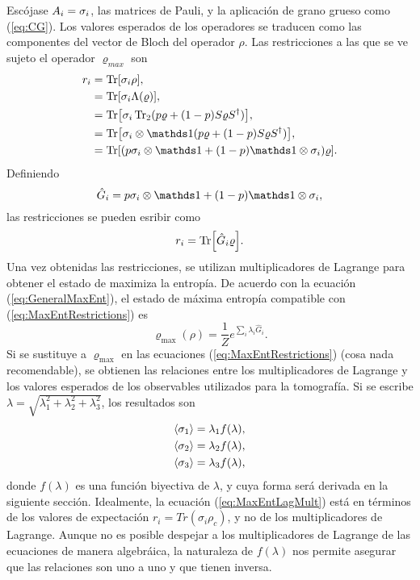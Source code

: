 Escójase ${A_{i}}={\sigma_{i}}$, las matrices de Pauli, y la aplicación de grano grueso como (\ref{eq:CG}). Los valores esperados de los operadores se traducen como las componentes del vector de Bloch del operador $\rho$. Las restricciones a las que se ve sujeto el operador $\varrho_{max}$ son
\begin{align*}
    r_{i}&=\Tr[\pauli{i}\rho],\\
    &=\Tr[\pauli{i}\Lambda(\varrho)],\\
    &=\Tr[\pauli{i}\Tr_{2}(p\varrho+(1-p)S\varrho S^{\dag})],\\
    &=\Tr[\pauli{i}\otimes\Id(p\varrho+(1-p)S\varrho S^{\dag})],\\
    &=\Tr[(p\pauli{i}\otimes\Id+(1-p)\Id\otimes\pauli{i})\varrho].
\end{align*}
Definiendo
\begin{equation}\label{eq:Ghat}
    \hat{G}_{i}=p\pauli{i}\otimes\Id+(1-p)\Id\otimes\pauli{i},
\end{equation}
las restricciones se pueden esribir como
\begin{equation}\label{eq:MaxEntRestrictions}
    r_{i}=\Tr[\hat{G}_{i}\varrho].
\end{equation}
Una vez obtenidas las restricciones, se utilizan multiplicadores de Lagrange para obtener el estado de maximiza la entropía. De acuerdo con la ecuación (\ref{eq:GeneralMaxEnt}), el estado de máxima entropía compatible con (\ref{eq:MaxEntRestrictions}) es
\begin{equation}\label{eq:MaxEntLagMult}
    \varrho_{\max}(\rho)=\frac{1}{Z}e^{\sum_{i}\lambda_{i}\hat{G}_{i}}.
\end{equation}
Si se sustituye a $\varrho_{\max}$ en las ecuaciones (\ref{eq:MaxEntRestrictions}) (cosa nada recomendable), se obtienen las relaciones entre los multiplicadores de Lagrange y los valores esperados de los observables utilizados para la tomografía. Si se escribe $\lambda=\sqrt{\lambda_{1}^{2}+\lambda_{2}^{2}+\lambda_{3}^{2}}$, los resultados son
\begin{align}\label{eq:MaxEntExpVals}
    \begin{split}
    \expval{\sigma_{1}}&=\lambda_{1}f(\lambda),\\
    \expval{\sigma_{2}}&=\lambda_{2}f(\lambda),\\
    \expval{\sigma_{3}}&=\lambda_{3}f(\lambda),
    \end{split}
\end{align}
donde $f(\lambda)$ es una función biyectiva de $\lambda$, y cuya forma será derivada en la siguiente sección. Idealmente, la ecuación (\ref{eq:MaxEntLagMult}) está en términos de los valores de expectación $r_{i}=Tr(\sigma_{i}\rho_{c})$, y no de los multiplicadores de Lagrange. Aunque no es posible despejar a los multiplicadores de Lagrange de las ecuaciones de manera algebráica, la naturaleza de $f(\lambda)$ nos permite asegurar que las relaciones son uno a uno y que tienen inversa.